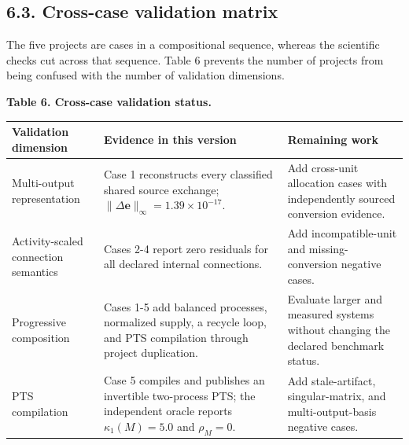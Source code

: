 \documentclass[
  10pt,
  a4paper,
  DIV=11,
  numbers=noendperiod]{scrartcl}
\newcounter{none} %
\begin{document}
\subsection{6.3. Cross-case validation
matrix}\label{cross-case-validation-matrix}

The five projects are cases in a compositional sequence, whereas the
scientific checks cut across that sequence. Table 6 prevents the number
of projects from being confused with the number of validation
dimensions.

\textbf{Table 6. Cross-case validation status.}

{\def\LTcaptype{none} %
\begin{longtable}[]{@{}
  >{\raggedright\arraybackslash}p{}
  >{\raggedright\arraybackslash}p{}
  >{\raggedright\arraybackslash}p{}@{}}
\toprule\noalign{}
\begin{minipage}[b]{\linewidth}\raggedright
Validation dimension
\end{minipage} & \begin{minipage}[b]{\linewidth}\raggedright
Evidence in this version
\end{minipage} & \begin{minipage}[b]{\linewidth}\raggedright
Remaining work
\end{minipage} \\
\midrule\noalign{}
\endhead
\bottomrule\noalign{}
\endlastfoot
Multi-output representation & Case 1 reconstructs every classified
shared source exchange;
\(\lVert\Delta\mathbf e\rVert_\infty=1.39\times10^{-17}\). & Add
cross-unit allocation cases with independently sourced conversion
evidence. \\
Activity-scaled connection semantics & Cases 2-4 report zero residuals
for all declared internal connections. & Add incompatible-unit and
missing-conversion negative cases. \\
Progressive composition & Cases 1-5 add balanced processes, normalized
supply, a recycle loop, and PTS compilation through project duplication.
& Evaluate larger and measured systems without changing the declared
benchmark status. \\
PTS compilation & Case 5 compiles and publishes an invertible
two-process PTS; the independent oracle reports \(\kappa_1(M)=5.0\) and
\(\rho_M=0\). & Add stale-artifact, singular-matrix, and
multi-output-basis negative cases. \\

\end{longtable}}
\end{document}
